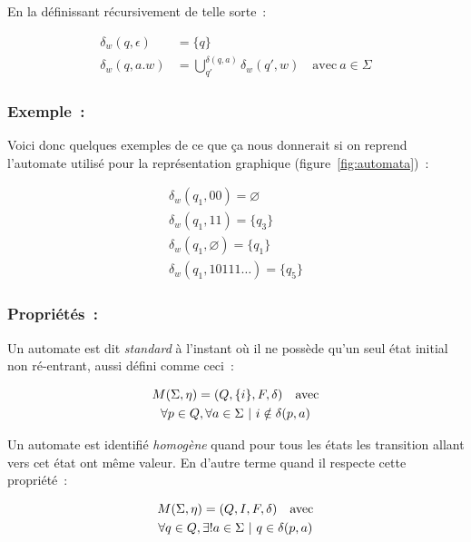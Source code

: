 \documentclass[12pt]{article}
\begin{document}
En la définissant récursivement de telle sorte~:

\begin{align}
    \delta_w(q, \epsilon) & = \{q\}                                                                       \\
    \delta_w(q, a.w)      & = \bigcup_{q'}^{\delta(q, a)} \delta_w(q', w) \quad \text{avec}~ a \in \Sigma
\end{align}

\subsubsection*{Exemple~:}

Voici donc quelques exemples de ce que ça nous donnerait si on reprend
l'automate utilisé pour la représentation graphique
(figure~\ref{fig:automata})~:

\begin{gather}
    \delta_w(q_1, 00) = \varnothing \\
    \delta_w(q_1, 11) = \{q_3\} \\
    \delta_w(q_1, \varnothing) = \{q_1\} \\
    \delta_w(q_1, 10111\dots) = \{q_5\}
\end{gather}

\subsubsection*{Propriétés~:}

Un automate est dit \textit{standard} à l'instant où il ne possède qu'un seul
état initial non ré-entrant, aussi défini comme ceci~:

\begin{gather}
    M(\Sigma, \eta) = (Q, \{i\}, F, \delta) \quad \text{avec} \\
    \forall p \in Q, \forall a \in \Sigma ~|~ i \notin \delta(p, a) \notag
\end{gather}

Un automate est identifié \textit{homogène} quand pour tous les états les
transition allant vers cet état ont même valeur. En d'autre terme quand il
respecte cette propriété~:

\begin{gather}
    M(\Sigma, \eta) = (Q, I, F, \delta) \quad \text{avec} \\
    \forall q \in Q, \exists! a \in \Sigma ~|~ q \in \delta(p, a) \notag
\end{gather}
\end{document}
